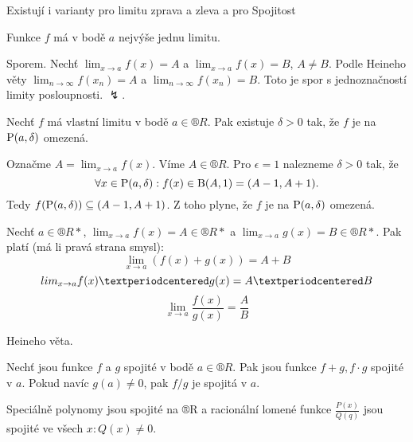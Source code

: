 \documentclass[12pt]{article}					%
\begin{document}

        \begin{poznamka}
            Existují i varianty pro limitu zprava a zleva a pro Spojitost
        \end{poznamka}

        \begin{veta}
            Funkce $f$ má v bodě $a$ nejvýše jednu limitu.

            \begin{dukazin}
                    Sporem. Nechť $\lim_{x \rightarrow a} f(x) = A$ a $\lim_{x \rightarrow a} f(x) = B$, $A≠B$. Podle Heineho věty $\lim_{n \rightarrow ∞} f(x_n) = A$ a $\lim_{n \rightarrow ∞} f(x_n) = B$. Toto je spor s jednoznačností limity posloupnosti. $\lightning$.
            \end{dukazin}
        \end{veta}

        \begin{veta}
            Nechť $f$ má vlastní limitu v bodě $a \in ®R$. Pak existuje $\delta > 0$ tak, že $f$ je na $\P(a, \delta)$ omezená.

            \begin{dukazin}
                Označme $A = \lim_{x \rightarrow a} f(x)$. Víme $A \in ®R$. Pro $\epsilon = 1$ nalezneme $\delta > 0$ tak, že
                $$ \forall x \in \P(a, \delta) : f(x) \in \B(A, 1) = (A-1, A+1). $$
                Tedy $f(\P(a, \delta)) \subseteq (A-1, A+1)$. Z toho plyne, že $f$ je na $\P(a, \delta)$ omezená.
            \end{dukazin}
        \end{veta}

        \begin{veta}
            Nechť $a \in ®R*$, $\lim_{x \rightarrow a} f(x) = A \in ®R*$ a $\lim_{x \rightarrow a} g(x) = B \in ®R*$. Pak platí (má li pravá strana smysl):
            $$ \lim_{x \rightarrow a} (f(x) + g(x)) = A+B $$
            $$ \\lim_{x \rightarrow a} f(x)·g(x) = A·B $$ 
            $$ \lim_{x \rightarrow a} \frac{f(x)}{g(x)} = \frac{A}{B} $$ 
            $$  $$ 
            \begin{dukazin}
                Heineho věta.
            \end{dukazin}
        \end{veta}

        \begin{dusledek}
            Nechť jsou funkce $f$ a $g$ spojité v bodě $a \in ®R$. Pak jsou funkce $f+g, f·g$ spojité v $a$. Pokud navíc $g(a) ≠ 0$, pak $f/g$ je spojitá v $a$.

            Speciálně polynomy jsou spojité na ®R a racionální lomené funkce $\frac{P(x)}{Q(q)}$ jsou spojité ve všech $x: Q(x)≠0$.
        \end{dusledek}
\end{document}
